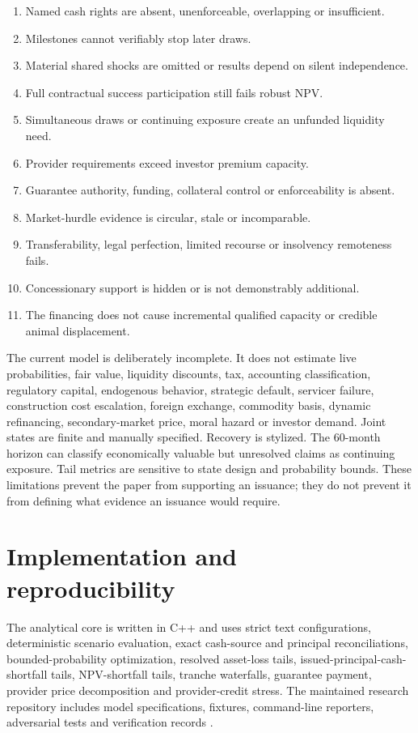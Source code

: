 \documentclass[11pt,a4paper]{article}
\begin{document}
\begin{enumerate}
  \item Named cash rights are absent, unenforceable, overlapping or insufficient.
  \item Milestones cannot verifiably stop later draws.
  \item Material shared shocks are omitted or results depend on silent independence.
  \item Full contractual success participation still fails robust NPV.
  \item Simultaneous draws or continuing exposure create an unfunded liquidity need.
  \item Provider requirements exceed investor premium capacity.
  \item Guarantee authority, funding, collateral control or enforceability is absent.
  \item Market-hurdle evidence is circular, stale or incomparable.
  \item Transferability, legal perfection, limited recourse or insolvency remoteness fails.
  \item Concessionary support is hidden or is not demonstrably additional.
  \item The financing does not cause incremental qualified capacity or credible animal displacement.
\end{enumerate}

The current model is deliberately incomplete. It does not estimate live probabilities, fair value, liquidity discounts, tax, accounting classification, regulatory capital, endogenous behavior, strategic default, servicer failure, construction cost escalation, foreign exchange, commodity basis, dynamic refinancing, secondary-market price, moral hazard or investor demand. Joint states are finite and manually specified. Recovery is stylized. The 60-month horizon can classify economically valuable but unresolved claims as continuing exposure. Tail metrics are sensitive to state design and probability bounds. These limitations prevent the paper from supporting an issuance; they do not prevent it from defining what evidence an issuance would require.

\section{Implementation and reproducibility}

The analytical core is written in C++ and uses strict text configurations, deterministic scenario evaluation, exact cash-source and principal reconciliations, bounded-probability optimization, resolved asset-loss tails, issued-principal-cash-shortfall tails, NPV-shortfall tails, tranche waterfalls, guarantee payment, provider price decomposition and provider-credit stress. The maintained research repository includes model specifications, fixtures, command-line reporters, adversarial tests and verification records \citep{fca2026brief,fca2026term,fca2026analysis}.
\end{document}
